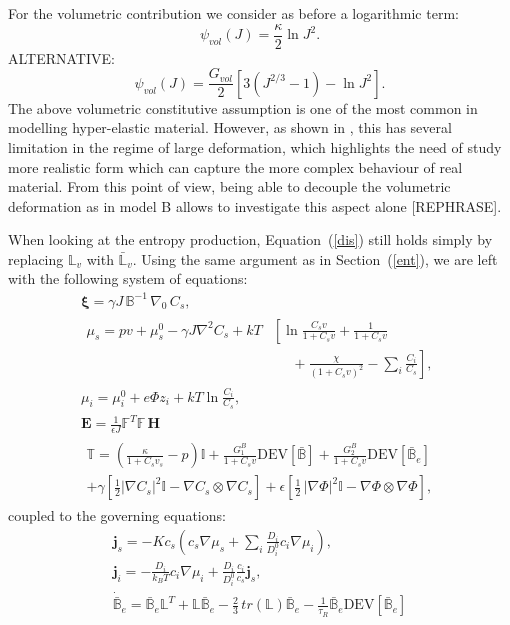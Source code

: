 \documentclass[runningheads]{llncs}
\newcommand{\F}{\ensuremath{\mathbb{F}}}
\newcommand{\B}{\ensuremath{\mathbb{B}}}
\newcommand{\LL}{\ensuremath{\mathbb{L}}}
\begin{document}
For the volumetric contribution we consider as before a logarithmic term:
\begin{equation}
\psi_{vol}(J) = \frac{\kappa}{2} \ln J^2. \label{psivol}
\end{equation}
ALTERNATIVE:
\begin{equation}
\psi_{vol}(J) = \frac{G_{vol}}{2}\left[3(J^{2/3}-1) -\ln J^2\right].
\end{equation}
The above volumetric constitutive assumption is one of the most common in modelling hyper-elastic material. However, as shown in \cite{vol}, this has several limitation in the regime of large deformation, which highlights the need of study more realistic form which can capture the more complex behaviour of real material. From this point of view, being able to decouple the volumetric deformation as in model B allows to investigate this aspect alone [REPHRASE].

When looking at the entropy production, Equation~(\ref{dis}) still holds simply by replacing $\LL_v$ with $\bar{\LL}_v$. Using the same argument as in Section~(\ref{ent}), we are left with the following system of equations:
\begin{gather}
\boldsymbol{\xi} = \gamma J \,\mathbb{B}^{-1} \,\nabla_0 \,C_s,\label{sys1B}\\[2mm]
\begin{aligned}
\mu_s = p v + \mu_s^0 - \gamma J \nabla^2 C_s + kT&\left[\ln \frac{C_s v}{1+C_s v} + \frac{1}{1+C_sv}\right.\\
&\left.\ \ \ \ \ \ +\frac{\chi}{(1+C_s v)^2}-\sum_i \frac{C_i}{C_s}\right], 
\end{aligned}\\[2.5mm]
\mu_i = \mu^0_i + e\Phi z_i + kT \ln \frac{C_i}{C_s},\\
\mathbf{E} = \frac{1}{\epsilon J} \F^T \F\, \mathbf{H}\, \\[3mm]
\begin{aligned}
\mathbb{T}= \left(\frac{\kappa}{1+C_sv_s}-p\right) \mathbb{I} + \frac{G^B_1}{1+C_sv}\text{DEV}[\bar{\B}] + \frac{G^B_2}{1+C_sv}\text{DEV}[\bar{\B}_e]\\
+ \gamma \left[\frac{1}{2} |\nabla C_s|^2\mathbb{I} - \nabla C_s \otimes \nabla C_s\right]+ \epsilon \left[\frac{1}{2} \,|\nabla \Phi|^2\mathbb{I} -\nabla \Phi \otimes \nabla \Phi\right],\label{sys2B}
\end{aligned}
\end{gather}
coupled to the governing equations:
\begin{gather}
\mathbf{j}_s = -K c_s \left(c_s\nabla \mu_s +\sum_i \frac{D_i}{D^0_i} c_i \nabla \mu_i\right),\\
\mathbf{j}_i = - \frac{D_i}{k_B T}c_i\nabla \mu_i + \frac{D_i}{D^0_i} \frac{c_i}{c_s} \mathbf{j}_s, \\
\dot{\bar{\B}}_e = \bar{\B}_e \LL^T +\LL \bar{\B}_e - \frac{2}{3} \, tr(\LL) \bar{\B}_e -\frac{1}{\tau_R} \bar{\B}_e \text{DEV}\left[\bar{\B}_e\right]
\end{gather}
%
\newpage


%
\end{document}
